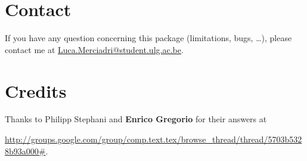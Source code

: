 \documentclass[10pt,a4paper,final]{article}
\begin{document}
\section{Contact}
If you have any question concerning this package (limitations, bugs, \ldots), please contact me at \href{mailto:Luca.Merciadri@student.ulg.ac.be}{Luca.Merciadri@student.ulg.ac.be}.


\section{Credits}
Thanks to Philipp Stephani and \textbf{Enrico Gregorio} for their answers at
\begin{center}
\url{http://groups.google.com/group/comp.text.tex/browse_thread/thread/5703b5328b93a000#}.
\end{center}
\end{document}
